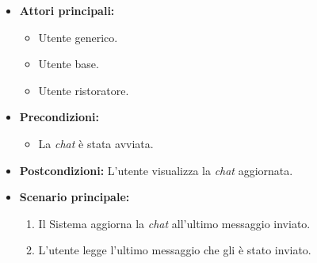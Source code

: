 \label{usecase:Lettura chat}
\begin{itemize}
	\item \textbf{Attori principali:} 
	\begin{itemize}
        \item Utente generico.
        \item Utente base.
        \item Utente ristoratore.
    \end{itemize}

	\item \textbf{Precondizioni:}
	\begin{itemize}
        \item La \textit{chat} è stata avviata.
    \end{itemize}

	\item \textbf{Postcondizioni:} L'utente visualizza la \textit{chat} aggiornata.

	\item \textbf{Scenario principale:}
            \begin{enumerate}
                \item Il Sistema aggiorna la \textit{chat} all'ultimo messaggio inviato.
                \item L'utente legge l'ultimo messaggio che gli è stato inviato.
	      \end{enumerate}
\end{itemize}